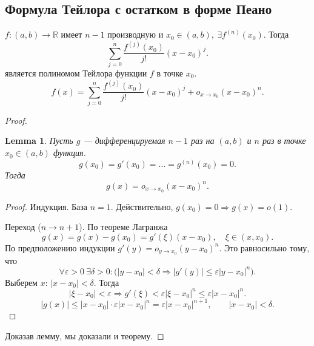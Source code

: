 \documentclass[11pt]{book}
\newcommand{\R}{\mathbb{R}}
\renewcommand{\le}{\leqslant}
\theoremstyle{definition}
\theoremstyle{plain}
\theoremstyle{plain}
\newtheorem*{lm}{Lemma}
\theoremstyle{definition}
\theoremstyle{remark}
\begin{document}
\subsection{Формула Тейлора с остатком в форме Пеано}
\begin{thm}
    $ f: (a, b) \to  \R$ имеет $ n-1$ производную и $ x_0 \in (a, b), ~ \exists f^{(n)}(x_0)$.
    Тогда 
    \[
	\sum_{j=0}^{n} \frac{f^{(j)}(x_0)}{j!} (x-x_0)^{j} 
    .\] 
    является полиномом Тейлора функции $ f$ в точке $ x_0$.
    \[
	f(x) = 	\sum_{j=0}^{n} \frac{f^{(j)}(x_0)}{j!} (x-x_0)^{j}  + o_{x \to  x_0} (x-x_0)^{n}
    .\] 
\end{thm}
\begin{proof}
    \begin{lm}
	Пусть $ g$ --- дифференцируемая $ n-1$ раз на $(a, b)$ и $ n$ раз в точке $ x_0 \in (a, b)$ функция. \[
	    g(x_0) = g'(x_0) = \ldots = g^{(n)}(x_0) = 0
	.\]  
	Тогда \[
	    g(x) = o_{x \to  x_0}(x-x_0)^{n}
	.\] 
    \end{lm}
    \begin{proof}
	Индукция. База $ n = 1$. Действительно, $ g(x_0) = 0 \Longrightarrow  g(x) = o(1)$.

	Переход ($ n \to n+1$). По теореме Лагранжа \[
	    g(x) = g(x) - g(x_0) = g'(\xi)(x-x_0), \quad \xi \in (x, x_0)
	.\] 
	По предположению индукции $ g'(y) = o_{y \to  x_0}(y-x_0)^{n}$. Это равносильно тому, что
	\[
	    \forall \varepsilon >0 ~ \exists \delta >0 : \bigl(|y-x_0|<\delta \Longrightarrow |g'(y)| \le \varepsilon |y-x_0|^{n}\bigr)
	.\] 
	Выберем $ x$:  $ |x - x_0| < \delta$. Тогда
	\[
	    |\xi - x_0| < \varepsilon  \Longrightarrow g'(\xi) < \varepsilon |\xi - x_0|^{n} \le \varepsilon |x-x_0|^{n}
	.\] 
	\[
	    |g(x)| \le |x-x_0|\cdot \varepsilon |x - x_0|^{n} = \varepsilon |x -x_0|^{n+1}, \qquad |x - x_0| < \delta
	.\] 
    \end{proof}
    Доказав лемму, мы доказали и теорему.
\end{proof}
\end{document}
